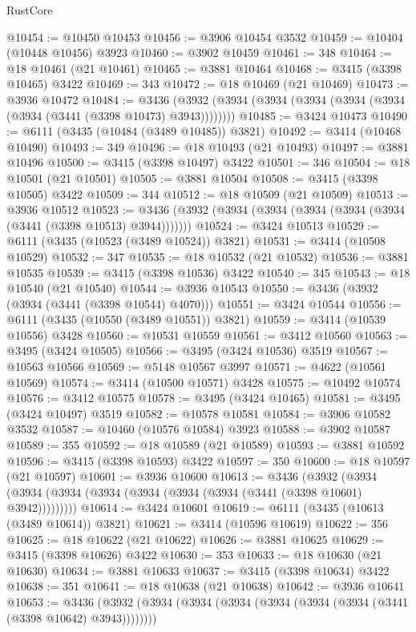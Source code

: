 \begin{lexlean}{RustCore}
\begin{coremodule}
@10454 := @10450 @10453
@10456 := @3906 @10454 @3532
@10459 := @10404 (@10448 @10456) @3923
@10460 := @3902 @10459
@10461 := 348
@10464 := @18 @10461 (@21 @10461)
@10465 := @3881 @10464
@10468 := @3415 (@3398 @10465) @3422
@10469 := 343
@10472 := @18 @10469 (@21 @10469)
@10473 := @3936 @10472
@10484 := @3436 (@3932 (@3934 (@3934 (@3934 (@3934 (@3934 (@3934 (@3441 (@3398 @10473) @3943))))))))
@10485 := @3424 @10473
@10490 := @6111 (@3435 (@10484 (@3489 @10485)) @3821)
@10492 := @3414 (@10468 @10490)
@10493 := 349
@10496 := @18 @10493 (@21 @10493)
@10497 := @3881 @10496
@10500 := @3415 (@3398 @10497) @3422
@10501 := 346
@10504 := @18 @10501 (@21 @10501)
@10505 := @3881 @10504
@10508 := @3415 (@3398 @10505) @3422
@10509 := 344
@10512 := @18 @10509 (@21 @10509)
@10513 := @3936 @10512
@10523 := @3436 (@3932 (@3934 (@3934 (@3934 (@3934 (@3934 (@3441 (@3398 @10513) @3944)))))))
@10524 := @3424 @10513
@10529 := @6111 (@3435 (@10523 (@3489 @10524)) @3821)
@10531 := @3414 (@10508 @10529)
@10532 := 347
@10535 := @18 @10532 (@21 @10532)
@10536 := @3881 @10535
@10539 := @3415 (@3398 @10536) @3422
@10540 := 345
@10543 := @18 @10540 (@21 @10540)
@10544 := @3936 @10543
@10550 := @3436 (@3932 (@3934 (@3441 (@3398 @10544) @4070)))
@10551 := @3424 @10544
@10556 := @6111 (@3435 (@10550 (@3489 @10551)) @3821)
@10559 := @3414 (@10539 @10556) @3428
@10560 := @10531 @10559
@10561 := @3412 @10560
@10563 := @3495 (@3424 @10505)
@10566 := @3495 (@3424 @10536) @3519
@10567 := @10563 @10566
@10569 := @5148 @10567 @3997
@10571 := @4622 (@10561 @10569)
@10574 := @3414 (@10500 @10571) @3428
@10575 := @10492 @10574
@10576 := @3412 @10575
@10578 := @3495 (@3424 @10465)
@10581 := @3495 (@3424 @10497) @3519
@10582 := @10578 @10581
@10584 := @3906 @10582 @3532
@10587 := @10460 (@10576 @10584) @3923
@10588 := @3902 @10587
@10589 := 355
@10592 := @18 @10589 (@21 @10589)
@10593 := @3881 @10592
@10596 := @3415 (@3398 @10593) @3422
@10597 := 350
@10600 := @18 @10597 (@21 @10597)
@10601 := @3936 @10600
@10613 := @3436
    (@3932 (@3934 (@3934 (@3934 (@3934 (@3934 (@3934 (@3934 (@3441 (@3398 @10601) @3942)))))))))
@10614 := @3424 @10601
@10619 := @6111 (@3435 (@10613 (@3489 @10614)) @3821)
@10621 := @3414 (@10596 @10619)
@10622 := 356
@10625 := @18 @10622 (@21 @10622)
@10626 := @3881 @10625
@10629 := @3415 (@3398 @10626) @3422
@10630 := 353
@10633 := @18 @10630 (@21 @10630)
@10634 := @3881 @10633
@10637 := @3415 (@3398 @10634) @3422
@10638 := 351
@10641 := @18 @10638 (@21 @10638)
@10642 := @3936 @10641
@10653 := @3436 (@3932 (@3934 (@3934 (@3934 (@3934 (@3934 (@3934 (@3441 (@3398 @10642) @3943))))))))

\end{coremodule}
\end{lexlean}
